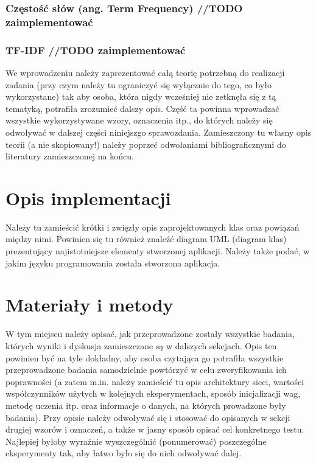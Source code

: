 \documentclass{classrep}
\begin{document}
\subsubsection{Częstość słów (ang. Term Frequency) //TODO zaimplementować}


\subsubsection{TF-IDF //TODO zaimplementować}



\newline \newline
{\color{blue}
We wprowadzeniu należy zaprezentować całą teorię potrzebną do realizacji
zadania (przy czym należy tu ograniczyć się wyłącznie do tego, co było
wykorzystane) tak aby osoba, która nigdy wcześniej nie zetknęła się z tą
tematyką, potrafiła zrozumieć dalszy opis. Część ta powinna wprowadzać
wszystkie wykorzystywane wzory, oznaczenia itp., do których należy się
odwoływać w dalszej części niniejszgo sprawozdania. Zamieszczony tu własny
opis teorii (a nie skopiowany!) należy poprzeć odwołaniami bibliograficznymi
do literatury zamieszczonej na końcu. }

\section{Opis implementacji}
{\color{blue}
Należy tu zamieścić krótki i zwięzły opis zaprojektowanych klas oraz powiązań
między nimi. Powinien się tu również znaleźć diagram UML  (diagram klas)
prezentujący najistotniejsze elementy stworzonej aplikacji. Należy także
podać, w jakim języku programowania została stworzona aplikacja. }

\section{Materiały i metody}
{\color{blue}
W tym miejscu należy opisać, jak przeprowadzone zostały wszystkie badania,
których wyniki i dyskusja zamieszczane są w dalszych sekcjach. Opis ten
powinien być na tyle dokładny, aby osoba czytająca go potrafiła wszystkie
przeprowadzone badania samodzielnie powtórzyć w celu zweryfikowania ich
poprawności (a zatem m.in. należy zamieścić tu opis architektury sieci,
wartości współczynników użytych w kolejnych eksperymentach, sposób
inicjalizacji wag, metodę uczenia itp. oraz informacje o danych, na których
prowadzone były badania). Przy opisie należy odwoływać się i stosować do
opisanych w sekcji drugiej wzorów i oznaczeń, a także w jasny sposób opisać
cel konkretnego testu. Najlepiej byłoby wyraźnie wyszczególnić (ponumerować)
poszczególne eksperymenty tak, aby łatwo było się do nich odwoływać dalej.}
\end{document}
